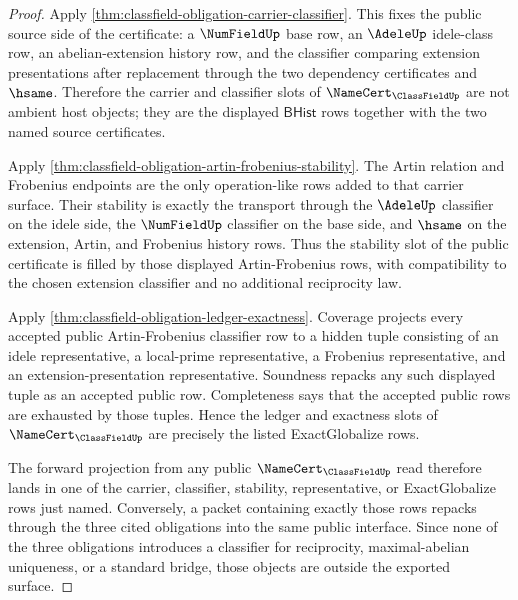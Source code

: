\begin{proof}
Apply \autoref{thm:classfield-obligation-carrier-classifier}. This fixes the public source side of the certificate: a $\NumFieldUp$ base row, an $\AdeleUp$ idele-class row, an abelian-extension history row, and the classifier comparing extension presentations after replacement through the two dependency certificates and $\hsame$. Therefore the carrier and classifier slots of $\NameCert_{\ClassFieldUp}$ are not ambient host objects; they are the displayed $\mathsf{BHist}$ rows together with the two named source certificates.

Apply \autoref{thm:classfield-obligation-artin-frobenius-stability}. The Artin relation and Frobenius endpoints are the only operation-like rows added to that carrier surface. Their stability is exactly the transport through the $\AdeleUp$ classifier on the idele side, the $\NumFieldUp$ classifier on the base side, and $\hsame$ on the extension, Artin, and Frobenius history rows. Thus the stability slot of the public certificate is filled by those displayed Artin-Frobenius rows, with compatibility to the chosen extension classifier and no additional reciprocity law.

Apply \autoref{thm:classfield-obligation-ledger-exactness}. Coverage projects every accepted public Artin-Frobenius classifier row to a hidden tuple consisting of an idele representative, a local-prime representative, a Frobenius representative, and an extension-presentation representative. Soundness repacks any such displayed tuple as an accepted public row. Completeness says that the accepted public rows are exhausted by those tuples. Hence the ledger and exactness slots of $\NameCert_{\ClassFieldUp}$ are precisely the listed ExactGlobalize rows.

The forward projection from any public $\NameCert_{\ClassFieldUp}$ read therefore lands in one of the carrier, classifier, stability, representative, or ExactGlobalize rows just named. Conversely, a packet containing exactly those rows repacks through the three cited obligations into the same public interface. Since none of the three obligations introduces a classifier for reciprocity, maximal-abelian uniqueness, or a standard bridge, those objects are outside the exported surface.
\end{proof}
